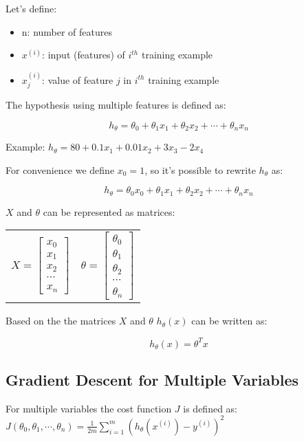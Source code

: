 \documentclass[a4paper]{article}
\begin{document}
Let's define:

\begin{itemize}
  \item n: number of features
  \item $x^{(i)}$: input (features) of $i^{th}$ training example
  \item $x_{j}^{(i)}$: value of feature $j$ in $i^{th}$ training example
\end{itemize}

The hypothesis using multiple features is defined as:

$$
h_\theta = \theta_0 + \theta_1 x_1 + \theta_2 x_2 + \cdots + \theta_n x_n
$$

Example: $h_\theta = 80 + 0.1 x_1 + 0.01 x_2 + 3 x_3 - 2 x_4$

For convenience we define $x_0 = 1$, so it's possible to rewrite $h_\theta$ as:

$$
h_\theta = \theta_0 x_0 + \theta_1 x_1 + \theta_2 x_2 + \cdots + \theta_n x_n
$$

$X$ and $\theta$ can be represented as matrices:

\medskip

\begin{center}
\begin{tabular}{cc}
$X = \left[ \begin{array}{c}
x_0 \\ x_1 \\ x_2 \\ \cdots \\ x_n \end{array} \right]$ &
$\theta = \left[ \begin{array}{c}
\theta_0 \\ \theta_1 \\ \theta_2 \\ \cdots \\ \theta_n \end{array} \right]$
\end{tabular}
\end{center}

Based on the the matrices $X$ and $\theta$ $h_\theta(x)$ can be written as:

\[ h_\theta(x) = \theta^T x \]

\subsection{Gradient Descent for Multiple Variables}

For multiple variables the cost function $J$ is defined as: $J(\theta_0, \theta_1, \cdots, \theta_n) = \frac{1}{2m}\sum_{i=1}^{m}(h_\theta(x^{(i)})-y^{(i)})^2$
\end{document}
